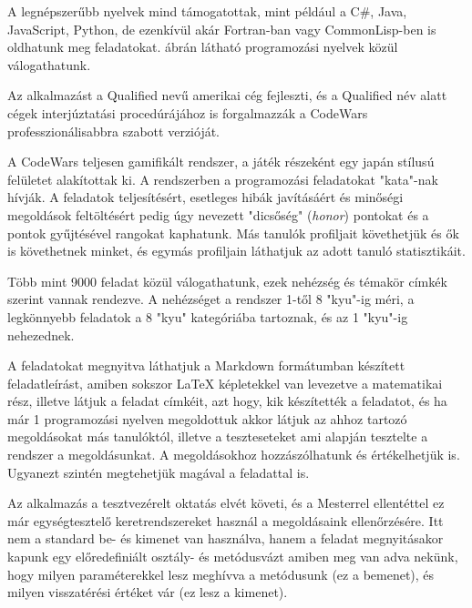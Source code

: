 A legnépszerűbb nyelvek mind támogatottak, mint például a C\#, Java, JavaScript, Python, de ezenkívül akár Fortran-ban vagy CommonLisp-ben is oldhatunk meg feladatokat.  ábrán látható programozási nyelvek közül válogathatunk.

Az alkalmazást a Qualified nevű amerikai cég fejleszti, és a Qualified név alatt cégek interjúztatási procedúrájához is forgalmazzák a CodeWars professzionálisabbra szabott verzióját. \cite{qualified}

A CodeWars teljesen gamifikált rendszer, a játék részeként egy japán stílusú felületet alakítottak ki. A rendszerben a programozási feladatokat "kata"-nak hívják. A feladatok teljesítésért, esetleges hibák javításáért és minőségi megoldások feltöltésért pedig úgy nevezett "dicsőség" (\emph{honor}) pontokat és a pontok gyűjtésével rangokat kaphatunk. Más tanulók profiljait követhetjük és ők is követhetnek minket, és egymás profiljain láthatjuk az adott tanuló statisztikáit.

Több mint 9000 feladat közül válogathatunk, ezek nehézség és témakör címkék szerint vannak rendezve. A nehézséget a rendszer 1-től 8 "kyu"-ig méri, a legkönnyebb feladatok a 8 "kyu" kategóriába tartoznak, és az 1 "kyu"-ig nehezednek.

A feladatokat megnyitva láthatjuk a Markdown formátumban készített feladatleírást, amiben sokszor \LaTeX{} képletekkel van levezetve a matematikai rész, illetve látjuk a feladat címkéit, azt hogy, kik készítették a feladatot, és ha már 1 programozási nyelven megoldottuk akkor látjuk az ahhoz tartozó megoldásokat más tanulóktól, illetve a teszteseteket ami alapján tesztelte a rendszer a megoldásunkat.
A megoldásokhoz hozzászólhatunk és értékelhetjük is. Ugyanezt szintén megtehetjük magával a feladattal is.

Az alkalmazás a tesztvezérelt oktatás elvét követi, és a Mesterrel ellentéttel ez már egységtesztelő keretrendszereket használ a megoldásaink ellenőrzésére. Itt nem a standard be- és kimenet van használva, hanem a feladat megnyitásakor kapunk egy előredefiniált osztály- és metódusvázt amiben meg van adva nekünk, hogy milyen paraméterekkel lesz meghívva a metódusunk (ez a bemenet), és milyen visszatérési értéket vár (ez lesz a kimenet).

